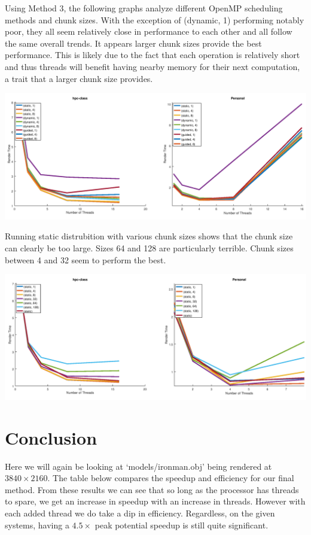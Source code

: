 \documentclass[12pt]{article}
\begin{document}
Using Method 3, the following graphs analyze different OpenMP scheduling methods and chunk sizes.
With the exception of (dynamic, 1) performing notably poor, 
they all seem relatively close in performance
to each other and all follow the same overall trends. 
It appears larger chunk sizes provide the best performance.
This is likely due to the fact that each operation is relatively short 
and thus threads will benefit having
nearby memory for their next computation, a trait that a larger chunk size provides.
\begin{center}
	\includegraphics[width=\textwidth]{scheduling.png}
\end{center}
Running static distrubition with various chunk sizes shows that the chunk size can clearly be too large.
Sizes 64 and 128 are particularly terrible. Chunk sizes between 4 and 32 seem to perform the best.
\begin{center}
	\includegraphics[width=\textwidth]{chunksize.png}
\end{center}

\clearpage
\section*{Conclusion}

Here we will again be looking at `models/ironman.obj' being rendered at $3840\times2160$. The
table below compares the speedup and efficiency for our final method. From these results
we can see that so long as the processor has threads to spare, we get an increase in
speedup with an increase in threads. However with each added thread we do take a dip in efficiency.
Regardless, on the given systems, having a $4.5\times$ peak potential speedup is still quite
significant.
\end{document}
